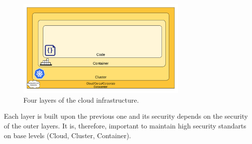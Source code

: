 \begin{figure}[!hbt]
	\begin{center}
		\includegraphics[width=0.75\textwidth]{images/cloud-security.png}
        \caption{Four layers of the cloud infrastructure.}
		\label{img:cloud-security}
	\end{center}
\end{figure}

Each layer is built upon the previous one and its security depends on the security of the outer layers. It is, therefore, important to maintain high security standarts on base levels (Cloud, Cluster, Container).

